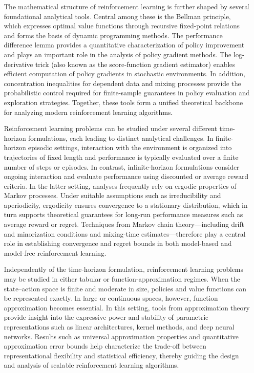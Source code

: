 \documentclass{article}
\numberwithin{equation}{section}
\begin{document}
\par
The mathematical structure of reinforcement learning is further shaped by several foundational analytical tools. Central among these is the Bellman principle, which expresses optimal value functions through recursive fixed-point relations and forms the basis of dynamic programming methods. The performance difference lemma provides a quantitative characterization of policy improvement and plays an important role in the analysis of policy gradient methods. The log-derivative trick (also known as the score-function gradient estimator) enables efficient computation of policy gradients in stochastic environments. In addition, concentration inequalities for dependent data and mixing processes provide the probabilistic control required for finite-sample guarantees in policy evaluation and exploration strategies. Together, these tools form a unified theoretical backbone for analyzing modern reinforcement learning algorithms.
\par
Reinforcement learning problems can be studied under several different time-horizon formulations, each leading to distinct analytical challenges. In finite-horizon episodic settings, interaction with the environment is organized into trajectories of fixed length and performance is typically evaluated over a finite number of steps or episodes. In contrast, infinite-horizon formulations consider ongoing interaction and evaluate performance using discounted or average reward criteria. In the latter setting, analyses frequently rely on ergodic properties of Markov processes. Under suitable assumptions such as irreducibility and aperiodicity, ergodicity ensures convergence to a stationary distribution, which in turn supports theoretical guarantees for long-run performance measures such as average reward or regret. Techniques from Markov chain theory—including drift and minorization conditions and mixing-time estimates—therefore play a central role in establishing convergence and regret bounds in both model-based and model-free reinforcement learning.
\par
Independently of the time-horizon formulation, reinforcement learning problems may be studied in either tabular or function-approximation regimes. When the state–action space is finite and moderate in size, policies and value functions can be represented exactly. In large or continuous spaces, however, function approximation becomes essential. In this setting, tools from approximation theory provide insight into the expressive power and stability of parametric representations such as linear architectures, kernel methods, and deep neural networks. Results such as universal approximation properties and quantitative approximation error bounds help characterize the trade-off between representational flexibility and statistical efficiency, thereby guiding the design and analysis of scalable reinforcement learning algorithms.
\end{document}

